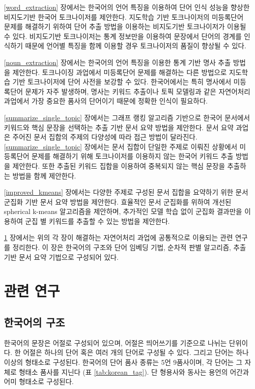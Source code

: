\documentclass[11pt]{article}
\begin{document}
\ref{word_extraction} 장에서는 한국어의 언어 특징을 이용하여 단어 인식 성능을 향상한 비지도기반 한국어 토크나이저를 제안한다.
지도학습 기반 토크나이저의 미등록단어 문제를 해결하기 위하여 단어 추출 방법을 이용하는 비지도기반  토크나이저가 이용될 수 있다.
비지도기반 토크나이저는 통계 정보만을 이용하여 문장에서 단어의 경계를 인식하기 때문에 언어별 특징을 함께 이용할 경우 토크나이저의 품질이 향상될 수 있다.

\ref{noun_extraction} 장에서는 한국어의 언어 특징을 이용한 통계 기반 명사 추출 방법을 제안한다.
토크나이징 과업에서 미등록단어 문제를 해결하는 다른 방법으로 지도학습 기반 토크나이저에 단어 사전을 보강할 수 있다.
한국어에서는 특히 명사에서 미등록단어 문제가 자주 발생하며, 명사는 키워드 추출이나 토픽 모델링과 같은 자연어처리 과업에서 가장 중요한 품사의 단어이기 때문에 정확한 인식이 필요하다.

\ref{summarize_single_topic} 장에서는 그래프 랭킹 알고리즘 기반으로 한국어 문서에서 키워드와 핵심 문장을 선택하는 추출 기반 문서 요약 방법을 제안한다.
문서 요약 과업은 주어진 문서 집합의 주제의 다양성에 따라 접근 방법이 달라진다.
\ref{summarize_single_topic} 장에서는 문서 집합이 단일한 주제로 이뤄진 상황에서 미등록단어 문제를 해결하기 위해 토크나이저를 이용하지 않는 한국어 키워드 추출 방법을 제안한다.
또한 추출된 키워드 집합을 이용하여 중복되지 않는 핵심 문장을 추출하는 방법을 함께 제안한다.

\ref{improved_kmeans} 장에서는 다양한 주제로 구성된 문서 집합을 요약하기 위한 문서 군집화 기반 문서 요약 방법을 제안한다.
효율적인 문서 군집화를 위하여 개선된 spherical k-means 알고리즘을 제안하며, 추가적인 모델 학습 없이 군집화 결과만을 이용하여 군집 별 키워드를 추출할 수 있는 방법을 제안한다.

\ref{related_works} 장에서는 위의 각 장이 해결하는 자연어처리 과업에 공통적으로 이용되는 관련 연구를 정리한다.
이 장은 한국어의 구조와 단어 임베딩 기법, 순차적 판별 알고리즘, 추출 기반 문서 요약 기법으로 구성되어 있다.

\newpage
\section{관련 연구} \label{related_works}

\subsection{한국어의 구조}

한국어의 문장은 어절로 구성되어 있으며, 어절은 띄어쓰기를 기준으로 나뉘는 단위이다.
한 어절은 하나의 단어 혹은 여러 개의 단어로 구성될 수 있다.
그리고 단어는 하나 이상의 형태소로 구성된다.
한국어의 단어 품사 종류는 5언 9품사이며, 각 단어는 그 자체로 형태소 품사를 지닌다 (표 \ref{tab:korean_tag}).
단 형용사와 동사는 용언의 어간과 어미 형태소로 구성된다.
\end{document}
